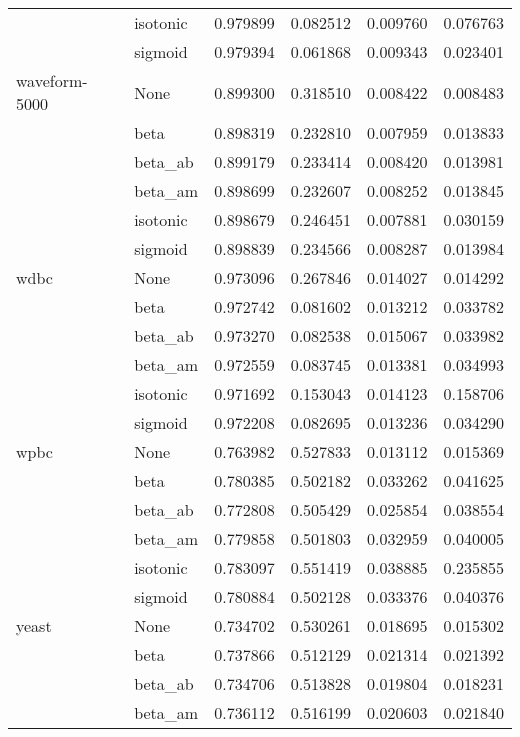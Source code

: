 \begin{tabular}{llrrrr}
        & isotonic &  0.979899 &  0.082512 &  0.009760 &  0.076763 \\
        & sigmoid &  0.979394 &  0.061868 &  0.009343 &  0.023401 \\
waveform-5000 & None &  0.899300 &  0.318510 &  0.008422 &  0.008483 \\
        & beta &  0.898319 &  0.232810 &  0.007959 &  0.013833 \\
        & beta\_ab &  0.899179 &  0.233414 &  0.008420 &  0.013981 \\
        & beta\_am &  0.898699 &  0.232607 &  0.008252 &  0.013845 \\
        & isotonic &  0.898679 &  0.246451 &  0.007881 &  0.030159 \\
        & sigmoid &  0.898839 &  0.234566 &  0.008287 &  0.013984 \\
wdbc & None &  0.973096 &  0.267846 &  0.014027 &  0.014292 \\
        & beta &  0.972742 &  0.081602 &  0.013212 &  0.033782 \\
        & beta\_ab &  0.973270 &  0.082538 &  0.015067 &  0.033982 \\
        & beta\_am &  0.972559 &  0.083745 &  0.013381 &  0.034993 \\
        & isotonic &  0.971692 &  0.153043 &  0.014123 &  0.158706 \\
        & sigmoid &  0.972208 &  0.082695 &  0.013236 &  0.034290 \\
wpbc & None &  0.763982 &  0.527833 &  0.013112 &  0.015369 \\
        & beta &  0.780385 &  0.502182 &  0.033262 &  0.041625 \\
        & beta\_ab &  0.772808 &  0.505429 &  0.025854 &  0.038554 \\
        & beta\_am &  0.779858 &  0.501803 &  0.032959 &  0.040005 \\
        & isotonic &  0.783097 &  0.551419 &  0.038885 &  0.235855 \\
        & sigmoid &  0.780884 &  0.502128 &  0.033376 &  0.040376 \\
yeast & None &  0.734702 &  0.530261 &  0.018695 &  0.015302 \\
        & beta &  0.737866 &  0.512129 &  0.021314 &  0.021392 \\
        & beta\_ab &  0.734706 &  0.513828 &  0.019804 &  0.018231 \\
        & beta\_am &  0.736112 &  0.516199 &  0.020603 &  0.021840 \\

\end{tabular}

